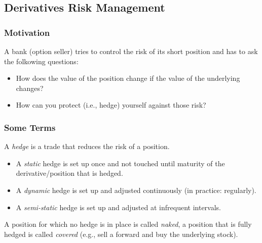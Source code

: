 

\subsection{Derivatives Risk Management}

\begin{frame}[fragile]
\frametitle{Motivation}
A bank (option seller) tries to control the risk of its short position and has to ask the folkowing questions:
\begin{itemize}
  \item How does the value of the position change if the value of the underlying changes?
  \item How can you protect (i.e., hedge) yourself against those risk?
\end{itemize}
\end{frame}

\begin{frame}[fragile]
\frametitle{Some Terms}
A \emph{hedge} is a trade that reduces the risk of a position.
\begin{itemize}
  \item A \emph{static} hedge is set up once and not touched until maturity of
  the derivative/position that is hedged.
  \item A \emph{dynamic} hedge is set up and adjusted continuously (in practice:
  regularly).
  \item A \emph{semi-static} hedge is set up and adjusted at infrequent
  intervals.
\end{itemize}
A position for which no hedge is in place is called \emph{naked}, a position
that is fully hedged is called \emph{covered} (e.g., sell a forward and buy the
underlying stock).
\end{frame}

